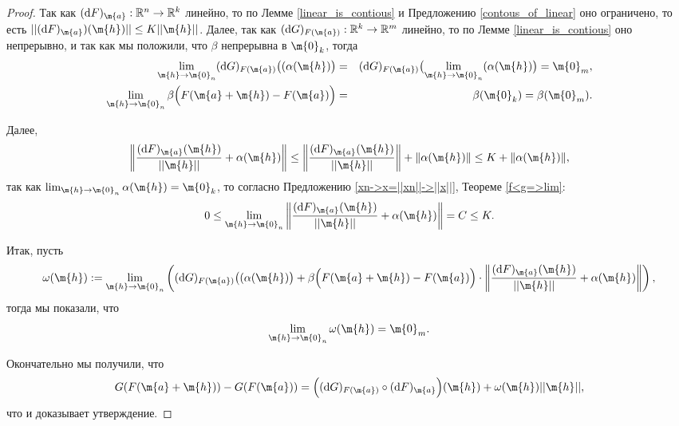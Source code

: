 \begin{proof}
Так как $(\mathrm{d}F)_\m{a}: \mathbb{R}^n \to \mathbb{R}^k$ линейно, то по Лемме \ref{linear_is_contious} и Предложению \ref{contous_of_linear} оно ограничено, то есть $|| (\mathrm{d}F)_\m{a})(\m{h}) || \le K ||\m{h}||$. Далее, так как $(\mathrm{d}G)_{F(\m{a})}: \mathbb{R}^k \to \mathbb{R}^m$ линейно, то по Лемме \ref{linear_is_contious} оно непрерывно, и так как мы положили, что $\beta$ непрерывна в $\m{0}_k$, тогда 
\begin{eqnarray*}
 \lim_{\m{h} \to \m{0}_n}(\mathrm{d}G)_{F(\m{a})}\bigl((\alpha(\m{h})\bigr) &=& (\mathrm{d}G)_{F(\m{a})}\bigl( \lim_{\m{h} \to \m{0}_n} (\alpha(\m{h})\bigr) = \m{0}_m,\\
 \lim_{\m{h} \to \m{0}_n} \beta \Bigl(F(\m{a} + \m{h}) - F(\m{a}) \Bigr) &=& \beta (\m{0}_k) = \beta(\m{0}_m). 
\end{eqnarray*}

Далее, 
\[
  \left\| \frac{(\mathrm{d}F)_\m{a}(\m{h})}{|| \m{h} ||} + \alpha(\m{h})  \right\| \le \left\| \frac{(\mathrm{d}F)_\m{a}(\m{h})}{|| \m{h} ||} \right\| + \| \alpha(\m{h}) \| \le K + \| \alpha(\m{h}) \|,
\]
так как $\lim_{\m{h} \to \m{0}_n}\alpha(\m{h}) = \m{0}_k$, то согласно Предложению \ref{xn->x=||xn||->||x||}, Теореме \ref{f<g=>lim}:
\[
 0 \le \lim_{\m{h} \to \m{0}_n}\left\| \frac{(\mathrm{d}F)_\m{a}(\m{h})}{|| \m{h} ||} + \alpha(\m{h})  \right\| =C \le K.
\]

Итак, пусть
\[
 \omega (\m{h}): = \lim_{\m{h} \to \m{0}_n}\left( (\mathrm{d}G)_{F(\m{a})}\bigl((\alpha(\m{h})\bigr) + \beta \Bigl(F(\m{a} + \m{h}) - F(\m{a}) \Bigr) \cdot \left\| \frac{(\mathrm{d}F)_\m{a}(\m{h})}{|| \m{h} ||} + \alpha(\m{h})  \right\| \right),
\]
тогда мы показали, что
\[
 \lim_{\m{h} \to \m{0}_n} \omega (\m{h}) = \m{0}_m. 
\]

Окончательно мы получили, что
\[
 G(F(\m{a}+\m{h})) -G(F(\m{a})) =\Bigl((\mathrm{d}G)_{F(\m{a})} \circ (\mathrm{d}F)_\m{a}\Bigr) (\m{h}) +   \omega (\m{h}) || \m{h} ||,
\]
что и доказывает утверждение.
\end{proof}
